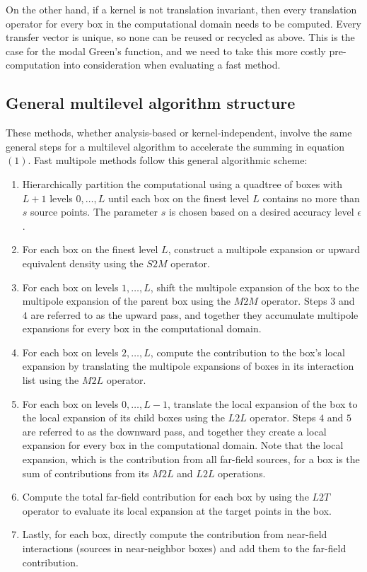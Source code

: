 \documentclass[11pt, oneside]{article}   	%
\begin{document}
On the other hand, if a kernel is not translation invariant, then every translation operator for every box in the computational domain needs to be computed. Every transfer vector is unique, so none can be reused or recycled as above. This is the case for the modal Green's function, and we need to take this more costly pre-computation into consideration when evaluating a fast method.

\subsection{General multilevel algorithm structure}
These methods, whether analysis-based or kernel-independent, involve the same general steps for a multilevel algorithm to accelerate the summing in equation $(1)$. Fast multipole methods follow this general algorithmic scheme:
\begin{enumerate}
\item Hierarchically partition the computational using a quadtree of boxes with $L+1$ levels $0,\dots,L$ until each box on the finest level $L$ contains no more than $s$ source points. The parameter $s$ is chosen based on a desired accuracy level $\epsilon$.
\item For each box on the finest level $L$, construct a multipole expansion or upward equivalent density using the $S2M$ operator.
\item For each box on levels $1,\dots,L$, shift the multipole expansion of the box to the multipole expansion of the parent box using the $M2M$ operator. Steps $3$ and $4$ are referred to as the upward pass, and together they accumulate multipole expansions for every box in the computational domain.
\item For each box on levels $2,\dots,L$, compute the contribution to the box's local expansion by translating the multipole expansions of boxes in its interaction list using the $M2L$ operator.
\item For each box on levels $0,\dots,L-1$, translate the local expansion of the box to the local expansion of its child boxes using the $L2L$ operator. Steps $4$ and $5$ are referred to as the downward pass, and together they create a local expansion for every box in the computational domain. Note that the local expansion, which is the contribution from all far-field sources, for a box is the sum of contributions from its $M2L$ and $L2L$ operations.
\item Compute the total far-field contribution for each box by using the $L2T$ operator to evaluate its local expansion at the target points in the box.
\item Lastly, for each box, directly compute the contribution from near-field interactions (sources in near-neighbor boxes) and add them to the far-field contribution.
\end{enumerate}
\end{document}
